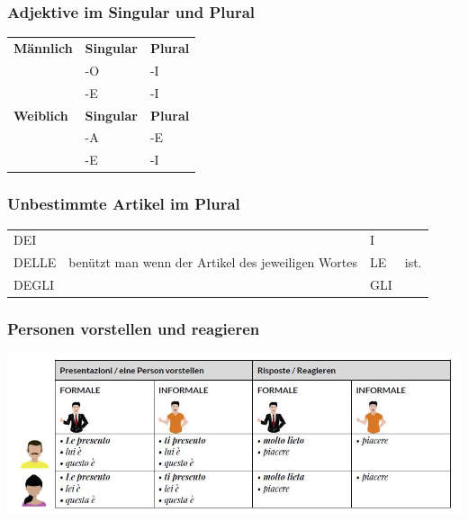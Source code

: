 \documentclass[10pt]{scrartcl}
\begin{document}
\subsubsection*{Adjektive im Singular und Plural}
\begin{tabular}{lll}
\textbf{Männlich} & \textbf{Singular} & \textbf{Plural}\\
& -O & -I\\
& -E & -I\\
\textbf{Weiblich} & \textbf{Singular} & \textbf{Plural}\\
& -A & -E\\
& -E & -I\\
\end{tabular}
\subsubsection*{Unbestimmte Artikel im Plural}
\begin{tabular}{llll}
DEI & & I\\
DELLE & benützt man wenn der Artikel des jeweiligen Wortes & LE & ist.\\
DEGLI & & GLI\\
\end{tabular}
\subsubsection*{Personen vorstellen und reagieren}
\includegraphics[scale=.8]{images/vorstellen.JPG}
\end{document}
